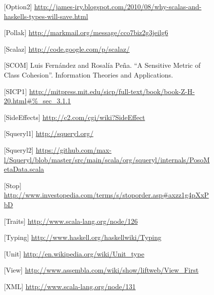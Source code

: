 \documentclass[a4]{article}
\begin{document}
\clearpage
\begin{figure}[b][Option2]
\url{http://james-iry.blogspot.com/2010/08/why-scalas-and-haskells-types-will-save.html}
\end{figure}
\begin{figure}[b][Pollak]
\url{http://markmail.org/message/cco7biz2g3jeilg6}
\end{figure}
\begin{figure}[b][Scalaz]
\url{http://code.google.com/p/scalaz/}
\end{figure}
\begin{figure}[b][SCOM]
Luis Fernández and Rosalía Peña. ``A Sensitive Metric of Class Cohesion''. Information Theories and Applications.
\end{figure}
\begin{figure}[b][SICP1]
\url{http://mitpress.mit.edu/sicp/full-text/book/book-Z-H-20.html\#\%_sec_3.1.1}
\end{figure}
\begin{figure}[b][SideEffects]
\url{http://c2.com/cgi/wiki?SideEffect}
\end{figure}
\begin{figure}[b][Squeryl1]
\url{http://squeryl.org/}
\end{figure}

\clearpage
\begin{figure}[b][Squeryl2]
\url{https://github.com/max-l/Squeryl/blob/master/src/main/scala/org/squeryl/internals/PosoMetaData.scala}
\end{figure}
\begin{figure}[b][Stop]
\url{http://www.investopedia.com/terms/s/stoporder.asp\#axzz1g4pXxPbD}
\end{figure}
\begin{figure}[b][Traits]
\url{http://www.scala-lang.org/node/126}
\end{figure}
\begin{figure}[b][Typing]
\url{http://www.haskell.org/haskellwiki/Typing}
\end{figure}
\begin{figure}[b][Unit]
\url{http://en.wikipedia.org/wiki/Unit_type}
\end{figure}
\begin{figure}[b][View]
\url{http://www.assembla.com/wiki/show/liftweb/View_First}
\end{figure}
\begin{figure}[b][XML]
\url{http://www.scala-lang.org/node/131}
\end{figure}
\end{document}
